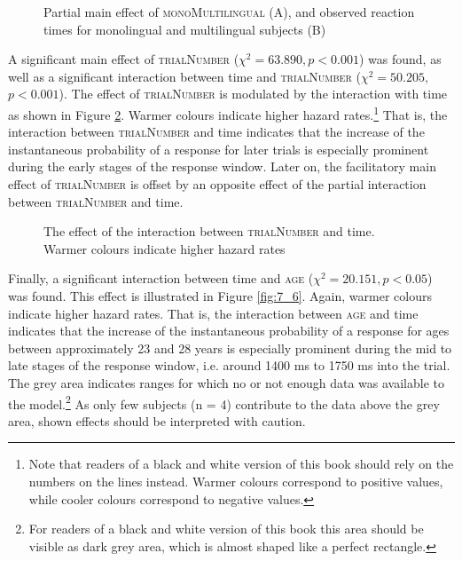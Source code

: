 \begin{figure}
    \centering
    
    \caption{Partial main effect of \textsc{monoMultilingual} (A), and observed reaction times for monolingual and multilingual subjects (B)}
    \label{fig:7_4}
\end{figure}

A significant main effect of \textsc{trialNumber} ($χ^{2}=63.890, p<0.001$) was found, as well as a significant interaction between time and \textsc{trialNumber} ($χ^{2}=50.205,$ $p<0.001$). The effect of \textsc{trialNumber} is modulated by the interaction with time as shown in Figure \ref{fig:7_5}. Warmer colours indicate higher hazard rates.\footnote{Note that readers of a black and white version of this book should rely on the numbers on the lines instead. Warmer colours correspond to positive values, while cooler colours correspond to negative values.} That is, the interaction between \textsc{trialNumber} and time indicates that the increase of the instantaneous probability of a response for later trials is especially prominent during the early stages of the response window. Later on, the facilitatory main effect of \textsc{trialNumber} is offset by an opposite effect of the partial interaction between \textsc{trialNumber} and time.

\begin{figure}
    \centering
    
    \caption{The effect of the interaction between \textsc{trialNumber} and time. Warmer colours indicate higher hazard rates}
    \label{fig:7_5}
\end{figure}

Finally, a significant interaction between time and \textsc{age} ($χ^{2}=20.151, p<0.05$) was found. This effect is illustrated in Figure \ref{fig:7_6}. Again, warmer colours indicate higher hazard rates. That is, the interaction between \textsc{age} and time indicates that the increase of the instantaneous probability of a response for ages between approximately 23 and 28 years is especially prominent during the mid to late stages of the response window, i.e. around 1400 ms to 1750 ms into the trial. The grey area indicates ranges for which no or not enough data was available to the model.\footnote{For readers of a black and white version of this book this area should be visible as dark grey area, which is almost shaped like a perfect rectangle.} As only few subjects (n = 4) contribute to the data above the grey area, shown effects should be interpreted with caution. 

